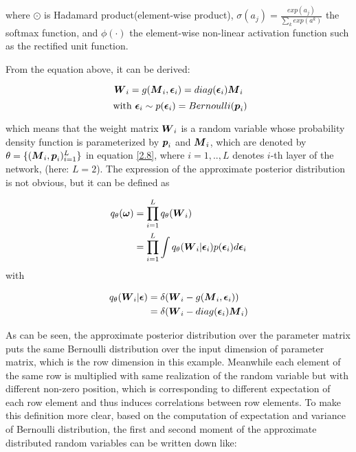 where $\odot$ is Hadamard product(element-wise product), $\sigma(a_{j}) = \frac{exp({a_{j}})}{\sum_{k}exp({a^{k}})}$  the softmax function, and $\phi(\cdot)$ the element-wise non-linear activation function such as the rectified unit function.

From the equation above, it can be derived:

\[
\boldsymbol W_{i} = g(\boldsymbol M_{i}, \boldsymbol \epsilon_{i})= diag(\boldsymbol \epsilon_{i}) \boldsymbol M_{i} 
\]
\[ 
\text{ with } \boldsymbol \epsilon_{i} \sim p(\boldsymbol \epsilon_{i}) = Bernoulli(\boldsymbol p_{i}) 
\]

which means that the weight matrix $\boldsymbol W_{i}$ is a random variable whose probability density function is parameterized by $\boldsymbol p_{i}$ and $\boldsymbol M_{i}$, which are denoted by $\theta = \{ (\boldsymbol M_{i}, \boldsymbol p_{i})_{i=1}^{L} \}$ in equation \ref{2.8}, where $i = {1,..,L}$ denotes $i$-th layer of the network, (here: $L = 2$).
The expression of the approximate posterior distribution is not obvious, but it can be defined as 

\begin{equation}
\begin{aligned} \label{appro_dist_form}
q_{\theta}(\boldsymbol \omega) &= \prod_{i=1}^{L} q_{\theta}(\boldsymbol W_{i})\\
&= \prod_{i=1}^{L}\int q_{\theta}(\boldsymbol W_{i} | \boldsymbol \epsilon_{i})p(\boldsymbol \epsilon_{i}) d\boldsymbol \epsilon_{i} 
\end{aligned}
\end{equation}
with

\begin{equation}
\begin{aligned} \label{appro_cond_dist_form}
q_{\theta}(\boldsymbol W_{i}|\boldsymbol \epsilon) &= \delta(\boldsymbol W_{i} - g(\boldsymbol M_{i}, \boldsymbol \epsilon_{i}))  \\
& = \delta(\boldsymbol W_{i} - diag(\boldsymbol \epsilon_{i})\boldsymbol M_{i})
\end{aligned}
\end{equation}

As can be seen, the approximate posterior distribution over the parameter matrix puts the same Bernoulli distribution over the input dimension of parameter matrix, which is the row dimension in this example. Meanwhile each element of the same row is multiplied with same realization of the random variable but with different non-zero position, which is corresponding to different expectation of each row element and thus induces correlations between row elements. To make this definition more clear, based on the computation of expectation and variance of Bernoulli distribution, the first and second moment of the approximate distributed random variables can be written down like:

